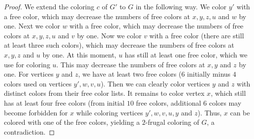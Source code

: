 \documentclass[10pt,a4paper]{article}
\begin{document}
\begin{proof}
We extend the coloring $c$ of $G'$ to $G$ in the following way. We color $y'$ with a free color, which may decrease the numbers of free colors at $x,y,z,u$ and $w$ by one. Next we color $w$ with a free color, which may decrease the numbers of free colors at $x,y,z,u$ and $v$ by one. Now we color $v$ with a free color (there are still at least three such colors), which may decrease the numbers of free colors at $x,y,z$ and $u$ by one. At this moment, $u$ has still at least one free color, which we use for coloring $u$. This may decrease the numbers of free colors at $x, y$ and $z$ by one. For vertices $y$ and $z$, we have at least two free colors ($6$ initially minus $4$ colors used on vertices $y',w,v,u$). Then we can clearly color vertices $y$ and $z$ with distinct colors from their free color lists. It remains to color vertex $x$, which still has at least four free colors (from initial $10$ free colors, additional $6$ colors may become forbidden for $x$ while coloring vertices $y',w,v,u,y$ and $z$). Thus, $x$ can be colored with one of the free   colors, yielding a $2$-frugal coloring of $G$, a contradiction.
\end{proof}
\end{document}
